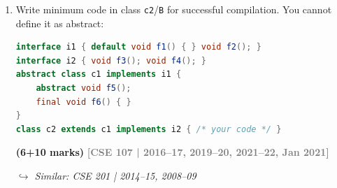 \documentclass[12pt,a3paper]{article}
\newcommand{\yr}[1]{\hfill\textcolor{gray}{\small\textbf{[#1]}}}
\newcommand{\mk}[1]{\textcolor{orange!70!black}{\small\textbf{(#1 marks)}}}
\newcommand{\variant}[1]{\par\vspace{1pt}\textcolor{blue!50!black}%
  {\footnotesize\textit{$\hookrightarrow$ Similar: #1}}}
\begin{document}
\begin{enumerate}
\begin{tcolorbox}
\textbf{Strategy:}
\begin{itemize}[itemsep=2pt]
  \item Chain \texttt{i1}, \texttt{i2}, \texttt{i3} so abstract class
    \texttt{A} implements only \texttt{i1} (1 interface rule).
  \item \texttt{A} declares at most 1 abstract method.
  \item \texttt{MyClass extends A} --- inherits everything, implements
    no interface directly.
\end{itemize}

\begin{lstlisting}[language=Java]
interface i1 { void f1(); void f2(); }
interface i2 extends i1 { void f3(); void f4(); }
interface i3 extends i2 { void f5(); void f6(); void f7(); }

abstract class A implements i3 {
    // implements f1..f6 concretely, declares f7 abstract
    public void f1() { System.out.println("f1"); }
    public void f2() { System.out.println("f2"); }
    public void f3() { System.out.println("f3"); }
    public void f4() { System.out.println("f4"); }
    public void f5() { System.out.println("f5"); }
    public void f6() { System.out.println("f6"); }
    public abstract void f7();   // <= 1 abstract method in A
}

class MyClass extends A {        // implements no interface directly
    public void f7() { System.out.println("f7"); }
}
\end{lstlisting}

\end{tcolorbox}

\item Write minimum code in class \texttt{c2}/\texttt{B} for successful compilation. You cannot define it as abstract:
\begin{lstlisting}[language=Java]
interface i1 { default void f1() { } void f2(); }
interface i2 { void f3(); void f4(); }
abstract class c1 implements i1 {
    abstract void f5();
    final void f6() { }
}
class c2 extends c1 implements i2 { /* your code */ }
\end{lstlisting}
\mk{6+10}
\yr{CSE 107 | 2016--17, 2019--20, 2021--22, Jan 2021}
\variant{CSE 201 | 2014--15, 2008--09}

\begin{tcolorbox}[enhanced,breakable,ansbox,
  colback=cD!4,colframe=cD,boxrule=0.8pt,arc=5pt,
  title={\textbf{Answer --- Minimum Code for \texttt{c2}}},
  fonttitle=\bfseries\color{white},colbacktitle=cD]


\end{tcolorbox}
\end{enumerate}
\end{document}
